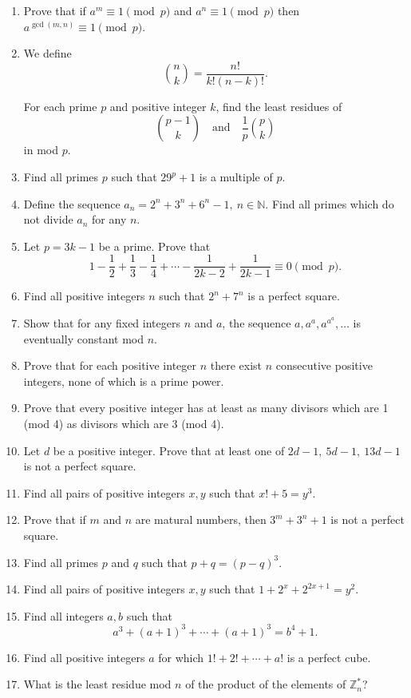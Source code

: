 \documentclass{article}
\begin{document}
\begin{enumerate}
  \item Prove that if $a^m\equiv 1\pmod p$ and $a^n\equiv 1\pmod p$ then
    $a^{\gcd(m,n)}\equiv 1\pmod p$.
  \item 
    We define
    \[\binom nk=\frac{n!}{k!(n-k)!}.\]

    For each prime $p$ and positive integer $k$, find the least residues of 
    \[\binom {p-1}k\quad\text{and}\quad\frac1p\binom pk\] in mod $p$.
  \item Find all primes $p$ such that $29^p+1$ is a multiple of $p$.
  \item Define the sequence $a_n=2^n+3^n+6^n-1,\ n\in\mathbb N$.
    Find all primes which do not divide $a_n$ for any $n$.
  \item Let $p=3k-1$ be a prime. Prove that
    \[1-\frac12+\frac13-\frac14+\cdots-\frac1{2k-2}+\frac1{2k-1}\equiv 0\pmod
    p.\]
  \item Find all positive integers $n$ such that $2^n+7^n$ is a perfect square.
  \item Show that for any fixed integers $n$ and $a$, the sequence
    $a,a^a,a^{a^a},\ldots$ is eventually constant mod $n$.
  \item Prove that for each positive integer $n$ there exist $n$ consecutive
    positive integers, none of which is a prime power.
  \item Prove that every positive integer has at least as many divisors which
    are 1 (mod 4) as divisors which are 3 (mod 4).
  \item Let $d$ be a positive integer. Prove that at least one of $2d-1,\ 5d-1,\
    13d-1$ is not a perfect square.
  \item Find all pairs of positive integers $x,y$ such that $x!+5=y^3$.
  \item Prove that if $m$ and $n$ are matural numbers, then $3^m+3^n+1$ is not a
    perfect square.
  \item Find all primes $p$ and $q$ such that $p+q=(p-q)^3$.
  \item Find all pairs of positive integers $x,y$ such that
    $1+2^x+2^{2x+1}=y^2$.
  \item Find all integers $a,b$ such that
    \[a^3+(a+1)^3+\cdots+(a+1)^3=b^4+1.\]
  \item Find all positive integers $a$ for which $1!+2!+\cdots+a!$ is a perfect
    cube.



  \item What is the least residue mod $n$ of the product of the elements of
    $\mathbb Z_n^*$?
\end{enumerate}
\end{document}
